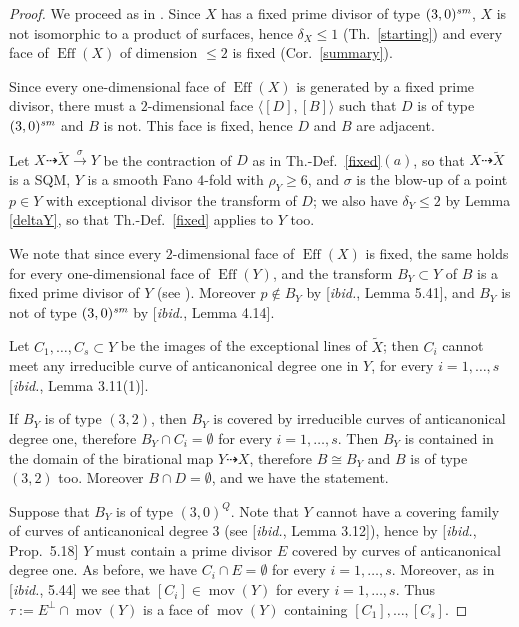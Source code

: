 \documentclass[a4paper,12pt]{amsart}
\theoremstyle{definition}
\numberwithin{figure}{section}
\numberwithin{table}{section}
\newcommand{\w}{\widetilde}
\newcommand{\Eff}{\operatorname{Eff}}
\newcommand{\mov}{\operatorname{mov}}
\newcommand{\sm}{\text{\it sm}}
\begin{document}
\begin{proof}
  We proceed as in \cite[proof of Th.~5.40]{blowup}.
Since $X$ has a fixed prime divisor of type $(3,0)^{\sm}$, $X$ is not isomorphic to a product of surfaces, hence $\delta_X\leq 1$ (Th.~\ref{starting}) and every face of $\Eff(X)$ of dimension $\leq 2$ is fixed (Cor.~\ref{summary}).

Since every one-dimensional face of $\Eff(X)$ is generated by a fixed prime divisor, there must a $2$-dimensional face $\langle [D], [B]\rangle$ such that 
 $D$ is
of type $(3,0)^{\sm}$ and
$B$ is not. This face is fixed, hence
$D$ and $B$ are adjacent.

Let $X\dasharrow \w{X}\stackrel{\sigma}{\to} Y$ be the contraction of $D$ as in Th.-Def.~\ref{fixed}$(a)$, so that $X\dasharrow \w{X}$ is a SQM, $Y$ is a smooth Fano $4$-fold with $\rho_Y\geq 6$, and $\sigma$ is the blow-up of a point $p\in Y$ with exceptional divisor the transform of $D$; we also have $\delta_Y\leq 2$ by Lemma \ref{deltaY}, so that Th.-Def.~\ref{fixed} applies to $Y$ too.

  We note that since every $2$-dimensional face of $\Eff(X)$ is fixed, the same holds for every one-dimensional face of $\Eff(Y)$, and the transform $B_Y\subset Y$ of $B$ is a fixed prime divisor of $Y$ (see \cite[Lemma 2.21]{blowup}). Moreover $p\not\in B_Y$ by [\emph{ibid.}, Lemma 5.41], and $B_Y$ is not of type $(3,0)^{\sm}$ by [\emph{ibid.}, Lemma 4.14].
  
  Let $C_1,\dotsc,C_s\subset Y$ be the images of the exceptional lines of $\w{X}$;  then $C_i$ cannot meet any irreducible curve of anticanonical degree one in $Y$, for every $i=1,\dotsc,s$ [\emph{ibid.}, Lemma 3.11(1)]. 

  If $B_Y$ is of type $(3,2)$, then $B_Y$ is covered by irreducible curves of anticanonical degree one, therefore $B_Y\cap C_i=\emptyset$ for   every $i=1,\dotsc,s$. Then
$B_Y$
is  contained in the domain of the birational map $Y\dasharrow X$, therefore $B\cong B_Y$ and $B$ is of type $(3,2)$ too. Moreover  $B\cap D=\emptyset$, and we have the statement.

  \medskip

Suppose that $B_Y$ is of type $(3,0)^Q$. Note that $Y$ cannot have a covering family of curves of anticanonical degree $3$ (see [\emph{ibid.}, Lemma 3.12]), hence by [\emph{ibid.}, Prop.~5.18] $Y$ must contain a prime divisor $E$ covered by curves of anticanonical degree one. As before, we have $C_i\cap E=\emptyset$ for every $i=1,\dotsc,s$. Moreover, as in [\emph{ibid.}, 5.44] we see that $[C_i]\in\mov(Y)$ for every $i=1,\dotsc,s$. Thus $\tau:=E^{\perp}\cap\mov(Y)$ is a face of $\mov(Y)$ containing $[C_1],\dotsc,[C_s]$.


\end{proof}
\end{document}
